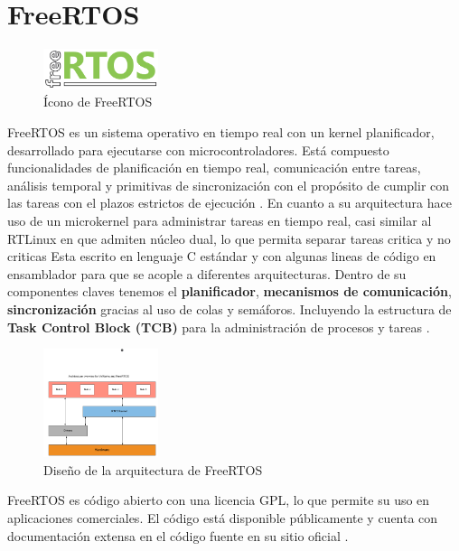 \section{FreeRTOS}
\begin{figure}[H]
    \centering
    \includegraphics[width=0.3\textwidth]{figures/FreeRTOS.png}
    \caption[Ícono de FreeRTOS]%
            {Ícono de FreeRTOS \citep{img_FreeRTOS}}
    \label{fig:sistema_operativo_FreeRTOS}
\end{figure}
FreeRTOS es un sistema operativo en tiempo real con un kernel planificador, desarrollado para ejecutarse con microcontroladores. Está compuesto funcionalidades de planificación en tiempo real, comunicación entre tareas, análisis temporal y primitivas de sincronización con el propósito de cumplir con las tareas con el plazos estrictos de ejecución \citep{He2020}.
En cuanto a su arquitectura hace uso de un microkernel para administrar tareas en tiempo real, casi similar al RTLinux en que admiten núcleo dual, lo que permita separar tareas critica y no criticas \citep{Serino2019} Esta escrito en lenguaje C estándar y con algunas lineas de código en ensamblador para que se acople a diferentes arquitecturas.
Dentro de su componentes claves tenemos el \textbf{planificador}, \textbf{mecanismos de comunicación}, \textbf{sincronización} gracias al uso de colas y semáforos. Incluyendo la estructura de \textbf{Task Control Block (TCB)} para la administración de procesos y tareas \citep{Barry2018}.
\begin{figure}[H]
    \centering
    \includegraphics[width=0.3\textwidth]{figures/ArquitecturaFreeRTOS.png}
    \caption[Arquitectura de FreeRTOS]%
            {Diseño de la arquitectura de FreeRTOS \citep{img_FreeRTOS}}
    \label{fig:Disenio_operativo_FreeRTOS}
\end{figure}
FreeRTOS es código abierto con una licencia GPL, lo que permite su uso en aplicaciones comerciales. El código está disponible públicamente y cuenta con documentación extensa en el código fuente en su sitio oficial \citep{FreeRTOS_org}.